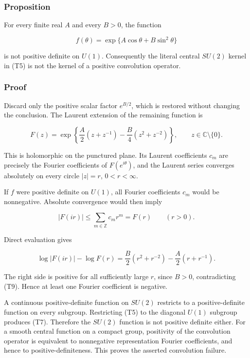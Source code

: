 \documentclass[
  11pt,
]{article}
\begin{document}
\hypertarget{proposition}{%
\subsubsection{Proposition}\label{proposition}}

For every finite real \(A\) and every \(B>0\), the function

\[
 f(\theta)=\exp\{A\cos\theta+B\sin^2\theta\}
 \tag{T7}
\]

is not positive definite on \(U(1)\). Consequently the literal central
\(SU(2)\) kernel in (T5) is not the kernel of a positive convolution
operator.

\hypertarget{proof}{%
\subsubsection{Proof}\label{proof}}

Discard only the positive scalar factor \(e^{B/2}\), which is restored
without changing the conclusion. The Laurent extension of the remaining
function is

\[
 F(z)=\exp\left\{
 \frac A2(z+z^{-1})-\frac B4(z^2+z^{-2})
 \right\},\qquad z\in\mathbb C\setminus\{0\}.
 \tag{T8}
\]

This is holomorphic on the punctured plane. Its Laurent coefficients
\(c_m\) are precisely the Fourier coefficients of \(F(e^{i\theta})\),
and the Laurent series converges absolutely on every circle \(|z|=r\),
\(0<r<\infty\).

If \(f\) were positive definite on \(U(1)\), all Fourier coefficients
\(c_m\) would be nonnegative. Absolute convergence would then imply

\[
 |F(ir)|\le\sum_{m\in\mathbb Z}c_m r^m=F(r)
 \qquad(r>0).
 \tag{T9}
\]

Direct evaluation gives

\[
 \log|F(ir)|-\log F(r)
 =\frac B2(r^2+r^{-2})-\frac A2(r+r^{-1}).
 \tag{T10}
\]

The right side is positive for all sufficiently large \(r\), since
\(B>0\), contradicting (T9). Hence at least one Fourier coefficient is
negative.

A continuous positive-definite function on \(SU(2)\) restricts to a
positive-definite function on every subgroup. Restricting (T5) to the
diagonal \(U(1)\) subgroup produces (T7). Therefore the \(SU(2)\)
function is not positive definite either. For a smooth central function
on a compact group, positivity of the convolution operator is equivalent
to nonnegative representation Fourier coefficients, and hence to
positive-definiteness. This proves the asserted convolution failure.
\end{document}
